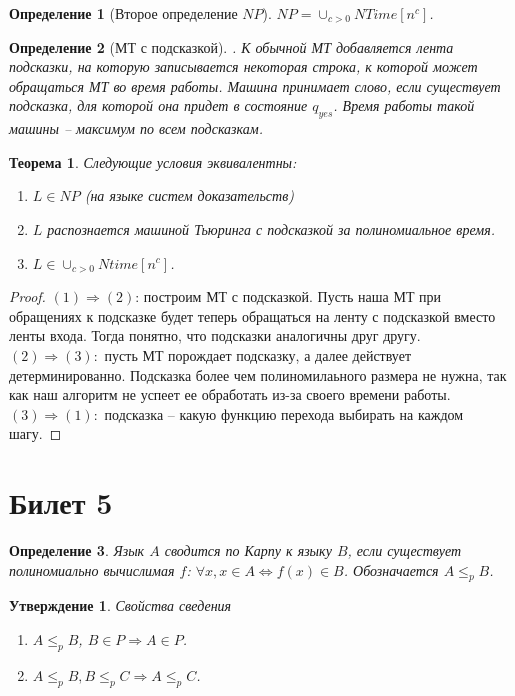 \documentclass[12pt, letterpaper]{article}
\newtheorem{theorem}{Теорема}[section]
\newtheorem{prop}{Утверждение}[section]
\newtheorem{defi}{Определение}[section]
\newcommand{\leqp}{\leq_{p}}
\begin{document}
\begin{defi}[Второе определение $NP$]
$NP = \cup_{c>0} NTime[n^c]$.
\end{defi}

\begin{defi}[МТ с подсказкой].
К обычной МТ добавляется лента подсказки, на которую записывается некоторая строка, к которой может обращаться МТ во время работы. Машина принимает слово, если существует подсказка, для которой она придет в состояние $q_{yes}$. Время работы такой машины -- максимум по всем подсказкам.
\end{defi}

\begin{theorem}
Следующие условия эквивалентны:
\begin{enumerate}
\item $L \in NP$ (на языке систем доказательств)
\item $L$ распознается машиной Тьюринга с подсказкой за полиномиальное время.
\item $L \in \cup_{c>0} Ntime[n^c]$.
\end{enumerate}
\end{theorem}

\begin{proof}
$(1) \Rightarrow (2)$: построим МТ с подсказкой. Пусть наша МТ при обращениях к подсказке будет теперь обращаться на ленту с подсказкой вместо ленты входа. Тогда понятно, что подсказки аналогичны друг другу.\\
$(2) \Rightarrow (3):$ пусть МТ порождает подсказку, а далее действует детерминированно. Подсказка более чем полиномилаьного размера не нужна, так как наш алгоритм не успеет ее обработать из-за своего времени работы.\\
$(3) \Rightarrow (1):$ подсказка -- какую функцию перехода выбирать на каждом шагу. 
\end{proof}

\section{Билет 5}
\begin{defi}
Язык $A$ сводится по Карпу к языку $B$, если существует полиномиально вычислимая $f$: $\forall x, x \in A \Longleftrightarrow f(x) \in B$. Обозначается $A \leq_{p} B$.
\end{defi}
\begin{prop} Свойства сведения
\begin{enumerate}
\item $A \leqp B$, $B \in P \Rightarrow A \in P$.
\item $A \leqp B, B \leqp C \Rightarrow A \leqp C$. 
\end{enumerate}
\end{prop}
\end{document}
